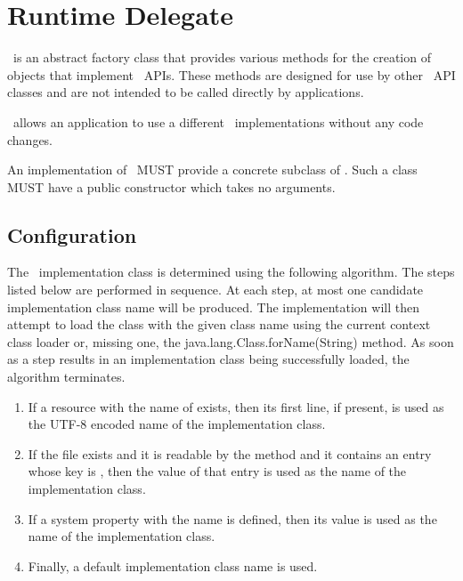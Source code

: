 \chapter{Runtime Delegate}

\rd\ is an abstract factory class that provides various methods for the creation of objects that implement \jaxrs\ APIs. These methods are designed for use by other \jaxrs\ API classes and are not intended to be called directly by applications.

\rd\ allows an application to use a different \jaxrs\ implementations without any code changes.

An implementation of \jaxrs\ MUST provide a concrete subclass of \rd. Such a class MUST have a public constructor which takes no arguments.

\section{Configuration}

The \rd\ implementation class is determined using the following algorithm. The steps listed below 
are performed in sequence. At each step, at most one candidate implementation class name will be produced. The implementation will then attempt to load the class with the given class name using the current context class loader or, missing one, the java.lang.Class.forName(String) method. As soon as a step results in an implementation class being successfully loaded, the algorithm terminates.
\begin{enumerate}
\item If a resource with the name of  exists, then its first line, if present, is used as the UTF-8 encoded name of the implementation class. 
\item If the  file exists and it is readable by the  method and it contains an entry whose key is , then the value of that entry is used as the name of the implementation class. 
\item If a system property with the name  is defined, then its value is used as the name of the implementation class. 
\item Finally, a default implementation class name is used. 
\end{enumerate}